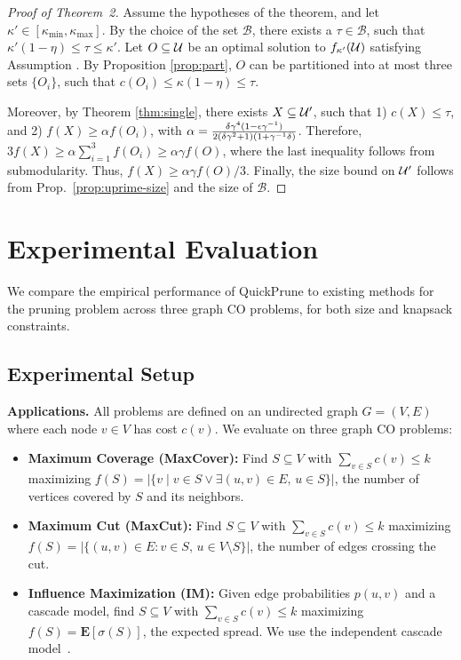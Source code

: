 \begin{proof}[Proof of Theorem~2]
  Assume the hypotheses of the theorem, and let
  $\kappa' \in [\kappa_{\min}, \kappa_{\max}]$. By the choice of
  the set $\mathcal B$, there
  exists a $\tau \in \mathcal B$, such that $\kappa'(1 - \eta) \le \tau \le \kappa'$.
  Let $O \subseteq \mathcal{U}$ be an optimal solution to $f_{\kappa'}( \mathcal{U} )$
  satisfying Assumption \nhi. By Proposition \ref{prop:part}, $O$ can be partitioned
  into at most three sets $\{ O_i \}$, such that $c( O_i ) \le \kappa ( 1 - \eta ) \le \tau$.

  Moreover, by Theorem \ref{thm:single}, there exists $X \subseteq \mathcal{U}'$, such that
  1) $c(X) \le \tau$, and
  2) $f(X) \ge
  \alpha f( O_i )$,
  with $\alpha =  \frac{\delta \gamma^4(1 - \epsilon \gamma^{-1})}{2(\delta \gamma^2 + 1)( 1 + \gamma^{-1} \delta ) }$.
  Therefore, $3f(X) \ge \alpha \sum_{i = 1}^3 f( O_i ) \ge \alpha \gamma f(O)$, where the last inequality follows from submodularity.
  Thus, $f(X) \ge \alpha \gamma f(O) / 3$.
  Finally, the size bound on $\mathcal{U}'$
  follows from Prop.~\ref{prop:uprime-size} and the size of $\mathcal B$.
\end{proof}

\section{Experimental Evaluation}

We compare the empirical performance of QuickPrune to existing methods for the pruning
problem across three graph CO problems, for both size and knapsack constraints.

\subsection{Experimental Setup}

\textbf{Applications.} All problems are defined on an undirected graph $G = (V, E)$ where
each node $v \in V$ has cost $c(v)$. We evaluate on three graph CO problems:

\begin{itemize}
  \item \textbf{Maximum Coverage (MaxCover):} Find $S \subseteq V$ with
    $\sum_{v \in S} c(v) \leq k$ maximizing
    $f(S) = |\{v \mid v \in S \lor \exists (u,v) \in E,\, u \in S\}|$,
    the number of vertices covered by $S$ and its neighbors.

  \item \textbf{Maximum Cut (MaxCut):} Find $S \subseteq V$ with
    $\sum_{v \in S} c(v) \leq k$ maximizing
    $f(S) = |\{(u,v) \in E : v \in S,\, u \in V \setminus S\}|$,
    the number of edges crossing the cut.

  \item \textbf{Influence Maximization (IM):} Given edge probabilities $p(u,v)$ and a
    cascade model, find $S \subseteq V$ with $\sum_{v \in S} c(v) \leq k$ maximizing
    $f(S) = \mathbf{E}[\sigma(S)]$, the expected spread. We use the independent cascade
    model~\citep{kempe2003maximizing}.

\end{itemize}

